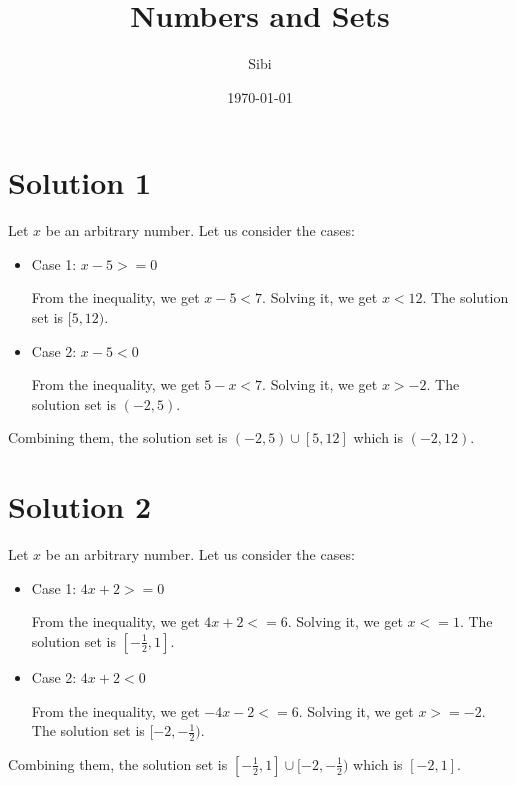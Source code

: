 \documentclass{article}
\begin{document}
\title{Numbers and Sets}
\author{Sibi}
\date{\today}
\maketitle

\DeclarePairedDelimiter\abs{\lvert}{\rvert}%
\DeclarePairedDelimiter\norm{\lVert}{\rVert}%

\makeatletter
\let\oldabs\abs
\def\abs{\@ifstar{\oldabs}{\oldabs*}}
% 
\let\oldnorm\norm
\def\norm{\@ifstar{\oldnorm}{\oldnorm*}}
\makeatother
\newpage

\section{Solution 1}

Let $x$ be an arbitrary number. Let us consider the cases:

\begin{itemize}
\item Case 1: $x - 5 >= 0$

  From the inequality, we get $x - 5 < 7$. Solving it, we get
  $x < 12$. The solution set is $[5, 12)$.
  
\item Case 2: $x - 5 < 0$

  From the inequality, we get $5 - x< 7$. Solving it, we get $x >
  -2$. The solution set is $(-2, 5)$.
\end{itemize}

Combining them, the solution set is $(-2, 5) \cup [5,12]$ which is
$(-2, 12)$.

\section{Solution 2}

Let $x$ be an arbitrary number. Let us consider the cases:

\begin{itemize}
\item Case 1: $4x + 2 >= 0$

  From the inequality, we get $4x + 2 <= 6$. Solving it, we get
  $x <= 1$. The solution set is $[-\frac{1}{2}, 1]$.
  
\item Case 2: $4x + 2 < 0$

  From the inequality, we get $-4x - 2 <= 6$. Solving it, we get
  $x >= -2$. The solution set is $[-2, -\frac{1}{2})$.
\end{itemize}

Combining them, the solution set is
$[-\frac{1}{2}, 1] \cup [-2, -\frac{1}{2})$ which is $[-2, 1]$.
\end{document}
